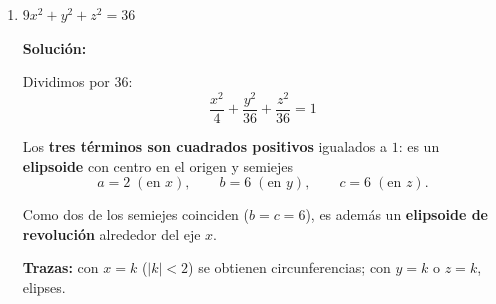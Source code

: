 \documentclass[12pt]{article}
\newcommand{\solucion}{%
    \vspace{0.8em}%
    \textbf{Solución:}%
    \vspace{0.8em}%
}
\begin{document}
\begin{enumerate}[label=\alph*.-]
    \textbf{Trazas:} con $y=k>0$ se obtiene $x^{2}+z^{2}=9k$, circunferencias
    de radio $3\sqrt{k}$; con $x=0$ resulta la parábola $z^{2}=9y$ y con $z=0$
    la parábola $x^{2}=9y$.

    \begin{center}
    \end{center}

    \item $9x^{2}+y^{2}+z^{2}=36$

    \solucion

    Dividimos por $36$:
    \[
    \boxed{
    \frac{x^{2}}{4}+\frac{y^{2}}{36}+\frac{z^{2}}{36}=1
    }
    \]

    Los \textbf{tres términos son cuadrados positivos} igualados a $1$: es un
    \textbf{elipsoide} con centro en el origen y semiejes
    \[
    a=2\;(\text{en }x),
    \qquad
    b=6\;(\text{en }y),
    \qquad
    c=6\;(\text{en }z).
    \]

    Como dos de los semiejes coinciden ($b=c=6$), es además un
    \textbf{elipsoide de revolución} alrededor del eje $x$.

    \textbf{Trazas:} con $x=k$ ($|k|<2$) se obtienen circunferencias; con $y=k$
    o $z=k$, elipses.

    \begin{center}
    \end{center}


\end{enumerate}
\end{document}
